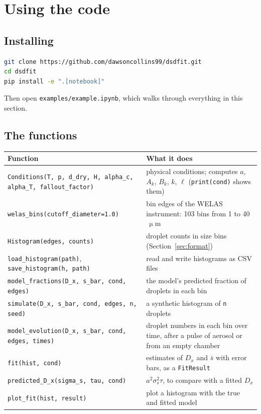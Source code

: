 \documentclass[11pt]{article}
\newcommand{\um}{\ensuremath{\,\upmu\mathrm{m}}\xspace}
\newcommand{\sbar}{\bar s}
\newcommand{\Dx}{D_x}
\newcommand{\code}[1]{\texttt{#1}}
\begin{document}
\section{Using the code}\label{sec:code}

\subsection{Installing}
\begin{lstlisting}[language=bash]
git clone https://github.com/dawsoncollins99/dsdfit.git
cd dsdfit
pip install -e ".[notebook]"
\end{lstlisting}
Then open \code{examples/example.ipynb}, which walks through everything in this section.

\subsection{The functions}

\begin{center}\small
\begin{tabularx}{\textwidth}{l X}
\toprule
Function & What it does \\
\midrule
\code{Conditions(T, p, d\_dry, H, alpha\_c, alpha\_T, fallout\_factor)} & physical conditions; computes $a$, $A_k$, $B_k$, $k$, $\ell$ (\code{print(cond)} shows them) \\
\code{welas\_bins(cutoff\_diameter=1.0)} & bin edges of the WELAS instrument: 103 bins from 1 to 40\um \\
\code{Histogram(edges, counts)} & droplet counts in size bins (Section~\ref{sec:format}) \\
\code{load\_histogram(path)}, \code{save\_histogram(h, path)} & read and write histograms as CSV files \\
\code{model\_fractions(D\_x, s\_bar, cond, edges)} & the model's predicted fraction of droplets in each bin \\
\code{simulate(D\_x, s\_bar, cond, edges, n, seed)} & a synthetic histogram of \code{n} droplets \\
\code{model\_evolution(D\_x, s\_bar, cond, edges, times)} & droplet numbers in each bin over time, after a pulse of aerosol or from an empty chamber \\
\code{fit(hist, cond)} & estimates of $\Dx$ and $\sbar$ with error bars, as a \code{FitResult} \\
\code{predicted\_D\_x(sigma\_s, tau, cond)} & $a^2\sigma_s^2\tau$, to compare with a fitted $\Dx$ \\
\code{plot\_fit(hist, result)} & plot a histogram with the true and fitted model \\
\bottomrule
\end{tabularx}
\end{center}
\end{document}
